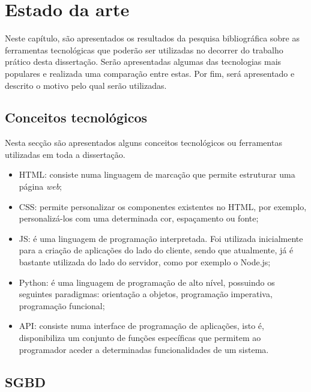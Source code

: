 \chapter{Estado da arte}
\label{state}


Neste capítulo, são apresentados os resultados da pesquisa bibliográfica sobre as ferramentas tecnológicas que poderão ser utilizadas no decorrer do trabalho prático desta dissertação. Serão apresentadas algumas das tecnologias mais populares e realizada uma comparação entre estas. Por fim, será apresentado e descrito o motivo pelo qual serão utilizadas. 
 


\section{Conceitos tecnológicos}


Nesta secção são apresentados alguns conceitos tecnológicos ou ferramentas utilizadas em toda a dissertação. 

\begin{itemize}
	\item \ac{HTML}: consiste numa linguagem de marcação que permite estruturar uma página \textit{web}; 
	
	\item \ac{CSS}: permite personalizar os componentes existentes no \linebreak \ac{HTML}, por exemplo, personalizá-los com uma determinada cor,  espaçamento ou fonte;  
	
	\item \ac{JS}: é uma linguagem de programação interpretada. Foi utilizada inicialmente para a criação de aplicações do lado do cliente, sendo que atualmente, já é bastante utilizada do lado do servidor, como por exemplo o Node.js; 
	
	\item Python: é uma  linguagem de programação de alto nível, possuindo os seguintes paradigmas:  orientação a objetos, programação imperativa, programação funcional;  
	
	
	\item \ac{API}: consiste numa interface de programação de aplicações, isto é, disponibiliza um conjunto de funções específicas que permitem ao programador aceder a determinadas funcionalidades de um sistema.  
	
\end{itemize}



\section{\acl{SGBD}}

